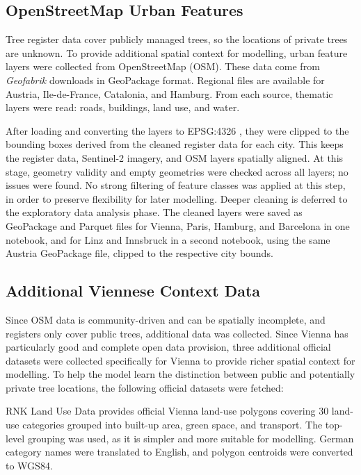 \subsection{OpenStreetMap Urban Features}

Tree register data cover publicly managed trees, so the locations of private trees are unknown. To provide additional spatial context for modelling, urban feature layers were collected from OpenStreetMap (OSM). These data come from \textit{Geofabrik} downloads \cite{geofabrikeurope} in GeoPackage format. Regional files are available for Austria, Ile-de-France, Catalonia, and Hamburg. From each source, thematic layers were read: roads, buildings, land use, and water.

After loading and converting the layers to EPSG:4326 \cite{epsg4326}, they were clipped to the bounding boxes derived from the cleaned register data for each city. This keeps the register data, Sentinel-2 imagery, and OSM layers spatially aligned. At this stage, geometry validity and empty geometries were checked across all layers; no issues were found. No strong filtering of feature classes was applied at this step, in order to preserve flexibility for later modelling. Deeper cleaning is deferred to the exploratory data analysis phase. The cleaned layers were saved as GeoPackage and Parquet files for Vienna, Paris, Hamburg, and Barcelona in one notebook, and for Linz and Innsbruck in a second notebook, using the same Austria GeoPackage file, clipped to the respective city bounds.

\subsection{Additional Viennese Context Data}

Since OSM data is community-driven and can be spatially incomplete, and registers only cover public trees, additional data was collected. Since Vienna has particularly good and complete open data provision, three additional official datasets were collected specifically for Vienna to provide richer spatial context for modelling. To help the model learn the distinction between public and potentially private tree locations, the following official datasets were fetched:

RNK Land Use Data \cite{landuse} provides official Vienna land-use polygons covering 30 land-use categories grouped into built-up area, green space, and transport. The top-level grouping was used, as it is simpler and more suitable for modelling. German category names were translated to English, and polygon centroids were converted to WGS84.

